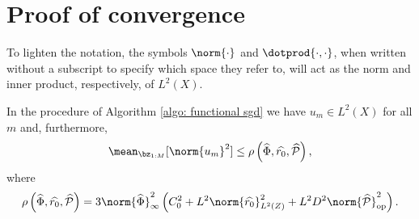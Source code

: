 \section{Proof of convergence}

To lighten the notation, the symbols $ \norm{ \cdot } $ and $ \dotprod{ \cdot, \cdot } $, when written without a subscript to specify which space they refer to, will act as the norm and inner product, respectively, of $ L^2 ( X ) $.

\begin{lemma}
    \label{lem: bound u_m}
    In the procedure of Algorithm \ref{algo: functional sgd} we have $ u_{ m } \in L^{ 2 } ( X ) $ for all $ m $ and, furthermore,
    \begin{equation*}
        \mean_{ \bz_{ 1:M } } [ \norm{ u_{ m } }^2 ] \leq
        \rho \left( \hat{ \Phi }, \hat{ r_{ 0 } }, \hat{ \meanop } \right) 
    ,\end{equation*}
    where
    \begin{equation*}
        \rho \left( \hat{ \Phi }, \hat{ r_{ 0 } }, \hat{ \meanop } \right) =
        3 \norm{ \hat{ \Phi } }_{ \infty }^2 \left(
            C_{ 0 }^2 + L^2 \norm{ \hat{ r_{ 0 } } }_{ L^2 ( Z ) }^2 + L^2 D^2 \norm{ \hat{ \meanop } }_{ \op }^2
        \right)
    .\end{equation*}
\end{lemma}
